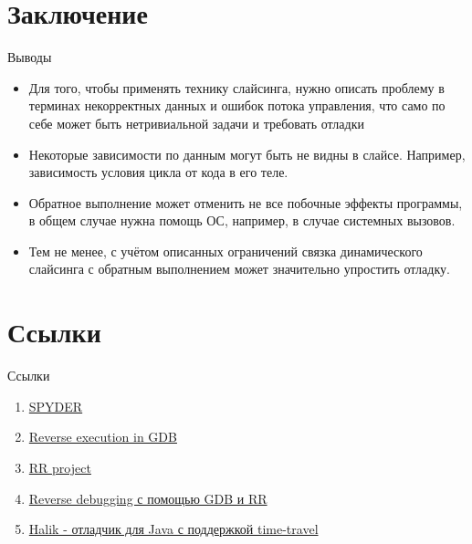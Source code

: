 \documentclass[presentation]{beamer}
\begin{document}
\section{Заключение}
\label{sec:org3c63a38}
\begin{frame}[label={sec:org3e1c801}]{Выводы}
\begin{itemize}
\item Для того, чтобы применять технику слайсинга, нужно описать проблему в терминах некорректных данных и ошибок потока управления, что само по себе может быть нетривиальной задачи и требовать отладки
\item Некоторые зависимости по данным могут быть не видны в слайсе. Например, зависимость условия цикла от кода в его теле.
\item Обратное выполнение может отменить не все побочные эффекты программы, в общем случае нужна помощь ОС, например, в случае системных вызовов.
\item Тем не менее, с учётом описанных ограничений связка динамического слайсинга с обратным выполнением может значительно упростить отладку.
\end{itemize}
\end{frame}
\section{Ссылки}
\label{sec:orgaa511dc}
\begin{frame}[label={sec:orgece74a4}]{Ссылки}
\begin{enumerate}
\item \href{https://spaf.cerias.purdue.edu/Students/spyder.html}{SPYDER}
\item \href{https://sourceware.org/gdb/onlinedocs/gdb/Reverse-Execution.html}{Reverse execution in GDB}
\item \href{https://rr-project.org/}{RR project}
\item \href{https://eax.me/reverse-debugging/}{Reverse debugging с помощью GDB и RR}
\item \href{https://github.com/pbadenski/halik}{Halik - отладчик для Java с поддержкой time-travel}
\end{enumerate}
\end{frame}
\end{document}
